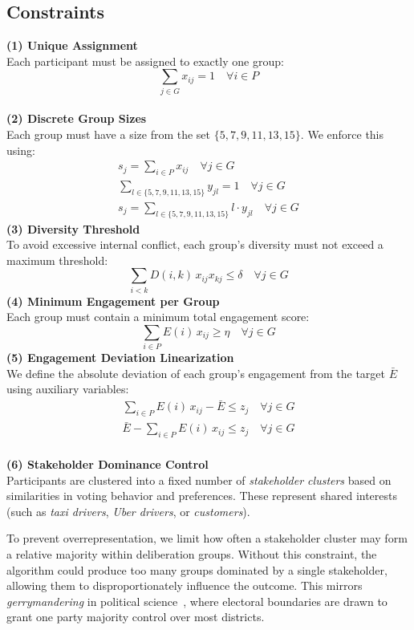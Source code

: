 \subsection*{Constraints}
\textbf{(1) Unique Assignment}\\[3pt]
Each participant must be assigned to exactly one group:
\[
\sum_{j \in G} x_{ij} = 1 \quad \forall i \in P
\]
\\
\textbf{(2) Discrete Group Sizes}\\[3pt]
Each group must have a size from the set \(\{5,7,9,11,13,15\}\).
We enforce this using:
\begin{gather*}
    s_j = \sum_{i \in P} x_{ij} \quad \forall j \in G\\
    \sum_{l \in \{5,7,9,11,13,15\}} y_{jl} = 1 \quad \forall j \in G\\
    s_j = \sum_{l \in \{5,7,9,11,13,15\}} l \cdot y_{jl} \quad \forall j \in G
\end{gather*}
\textbf{(3) Diversity Threshold}\\[3pt]
To avoid excessive internal conflict, each group's diversity must not exceed a maximum threshold:
\[
\sum_{i < k} D(i,k)\,x_{ij} x_{kj} \leq \delta \quad \forall j \in G
\]
\textbf{(4) Minimum Engagement per Group}\\[3pt]
Each group must contain a minimum total engagement score:
\[
\sum_{i \in P} E(i)\,x_{ij} \geq \eta \quad \forall j \in G
\]
\textbf{(5) Engagement Deviation Linearization}\\[3pt]
We define the absolute deviation of each group's engagement from the target \(\bar{E}\) using auxiliary variables:
\begin{gather*}
    \sum_{i \in P} E(i)\,x_{ij} - \bar{E} \leq z_j \quad \forall j \in G\\
    \bar{E} - \sum_{i \in P} E(i)\,x_{ij} \leq z_j \quad \forall j \in G\\
\end{gather*}


\textbf{(6) Stakeholder Dominance Control}\\[3pt]

Participants are clustered into a fixed number of \emph{stakeholder clusters}
based on similarities in voting behavior and preferences.
These represent shared interests (such as \textit{taxi drivers}, \textit{Uber drivers}, or \textit{customers}).

To prevent overrepresentation, we limit how often
a stakeholder cluster may form a relative majority within deliberation groups.
Without this constraint, the algorithm could produce too many groups dominated by a single stakeholder,
allowing them to disproportionately influence the outcome.
This mirrors \emph{gerrymandering} in political science~\parencite{gerrymandering2019},
where electoral boundaries are drawn to grant one party majority control over most districts.

